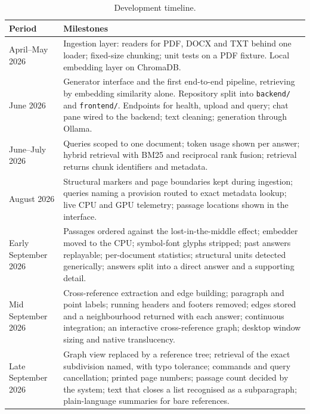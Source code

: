 \begin{table}[ht]
\centering
\small
\begin{tabularx}{\textwidth}{@{}lX@{}}
\toprule
Period & Milestones \\
\midrule
April--May 2026      & Ingestion layer: readers for PDF, DOCX and TXT behind
                       one loader; fixed-size chunking; unit tests on a PDF
                       fixture. Local embedding layer on ChromaDB. \\
June 2026            & Generator interface and the first end-to-end pipeline,
                       retrieving by embedding similarity alone. Repository
                       split into \texttt{backend/} and \texttt{frontend/}.
                       Endpoints for health, upload and query; chat pane wired
                       to the backend; text cleaning; generation through
                       Ollama. \\
June--July 2026      & Queries scoped to one document; token usage shown per
                       answer; hybrid retrieval with BM25 and reciprocal rank
                       fusion; retrieval returns chunk identifiers and
                       metadata. \\
August 2026          & Structural markers and page boundaries kept during
                       ingestion; queries naming a provision routed to exact
                       metadata lookup; live CPU and GPU telemetry; passage
                       locations shown in the interface. \\
Early September 2026 & Passages ordered against the lost-in-the-middle
                       effect; embedder moved to the CPU; symbol-font glyphs
                       stripped; past answers replayable; per-document
                       statistics; structural units detected generically;
                       answers split into a direct answer and a supporting
                       detail. \\
Mid September 2026   & Cross-reference extraction and edge building; paragraph
                       and point labels; running headers and footers removed;
                       edges stored and a neighbourhood returned with each
                       answer; continuous integration; an interactive
                       cross-reference graph; desktop window sizing and native
                       translucency. \\
Late September 2026  & Graph view replaced by a reference tree; retrieval of
                       the exact subdivision named, with typo tolerance;
                       commands and query cancellation; printed page numbers;
                       passage count decided by the system; text that closes a
                       list recognised as a subparagraph; plain-language
                       summaries for bare references. \\
\bottomrule
\end{tabularx}
\caption{Development timeline.}
\label{tab:timeline}
\end{table}

